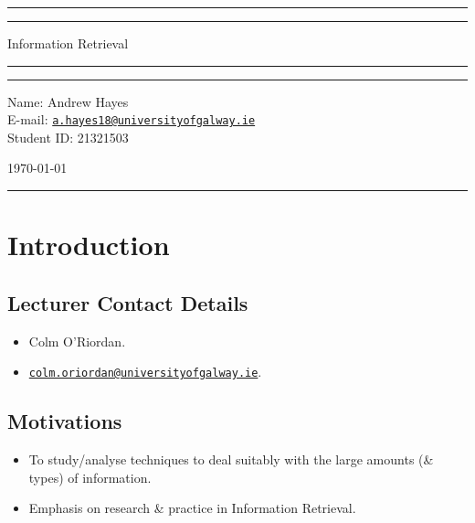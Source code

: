 \documentclass[a4paper,11pt]{article}
\author{Andrew Hayes}
\begin{document}
\begin{titlepage}
    \begin{center}
        \hrule
        \vspace*{0.6cm}
        \vspace*{0.6cm}
        \hrule
        \LARGE
        \vspace{0.5cm}
            Information Retrieval
        \vspace{0.5cm}
        \hrule

        \vfill
        \vfill

        \hrule
        \begin{minipage}{0.495\textwidth} 
            \vspace{0.4em}
            \raggedright
            \normalsize 
            Name: Andrew Hayes \\
            E-mail: \href{mailto://a.hayes18@universityofgalway.ie}{\texttt{a.hayes18@universityofgalway.ie}}  \hfill\\   
            Student ID: 21321503 \hfill
        \end{minipage}
        \begin{minipage}{0.495\textwidth} 
            \raggedleft
            \vspace*{0.8cm}
            \Large
            \today
            \vspace*{0.6cm}
        \end{minipage}
        \medskip\hrule 
    \end{center}
\end{titlepage}

\newpage
\tableofcontents
\newpage
\setcounter{page}{1}

\section{Introduction}
\subsection{Lecturer Contact Details}
\begin{itemize}
    \item   Colm O'Riordan.
    \item   \href{mailto://colm.oriordan@universityofgalway.ie}{\texttt{colm.oriordan@universityofgalway.ie}}.
\end{itemize}

\subsection{Motivations}
\begin{itemize}
    \item   To study/analyse techniques to deal suitably with the large amounts (\& types) of information.
    \item   Emphasis on research \& practice in Information Retrieval.
\end{itemize}
\end{document}
